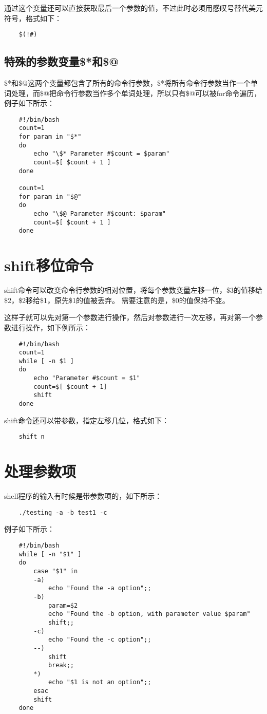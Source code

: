 \documentclass[a4paper,left=2.5cm,right=2.5cm,11pt]{article}
\begin{document}
	通过这个变量还可以直接获取最后一个参数的值，不过此时必须用感叹号替代美元符号，格式如下：
	\begin{lstlisting}
	$(!#)
	\end{lstlisting}

\subsection{特殊的参数变量\$*和\$@}
	\$*和\$@这两个变量都包含了所有的命令行参数，\$*将所有命令行参数当作一个单词处理，而\$@把命令行参数当作多个单词处理，所以只有\$@可以被for命令遍历，例子如下所示：
	\begin{lstlisting}
	#!/bin/bash
	count=1
	for param in "$*"
	do
		echo "\$* Parameter #$count = $param"
		count=$[ $count + 1 ]
	done

	count=1
	for param in "$@"
	do
		echo "\$@ Parameter #$count: $param"
		count=$[ $count + 1 ]
	done
	\end{lstlisting}

\section{shift移位命令}
	shift命令可以改变命令行参数的相对位置，将每个参数变量左移一位，\$3的值移给\$2，\$2移给\$1，原先\$1的值被丢弃。
	需要注意的是，\$0的值保持不变。\par
	这样子就可以先对第一个参数进行操作，然后对参数进行一次左移，再对第一个参数进行操作，如下例所示：
	\begin{lstlisting}
	#!/bin/bash
	count=1
	while [ -n $1 ]
	do
		echo "Parameter #$count = $1"
		count=$[ $count + 1]
		shift
	done
	\end{lstlisting}

	shift命令还可以带参数，指定左移几位，格式如下：
	\begin{lstlisting}
	shift n
	\end{lstlisting}

\section{处理参数项}
	shell程序的输入有时候是带参数项的，如下所示：
	\begin{lstlisting}
	./testing -a -b test1 -c
	\end{lstlisting}

	例子如下所示：
	\begin{lstlisting}
	#!/bin/bash
	while [ -n "$1" ]
	do
		case "$1" in
		-a)
			echo "Found the -a option";;
		-b)
			param=$2
			echo "Found the -b option, with parameter value $param"
			shift;;
		-c)
			echo "Found the -c option";;
		--)
			shift
			break;;
		*)
			echo "$1 is not an option";;
		esac
		shift
	done
	\end{lstlisting}
\end{document}
